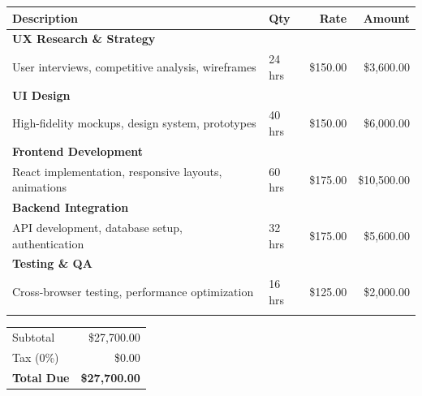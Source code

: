 \documentclass[11pt,a4paper]{article}
\begin{document}
\vspace{16pt}

\begin{tabularx}{\textwidth}{Xlrr}
    \toprule
    \textbf{Description} & \textbf{Qty} & \textbf{Rate} & \textbf{Amount} \\
    \midrule
    \addlinespace
    \textbf{UX Research \& Strategy} & & & \\
    \quad User interviews, competitive analysis, wireframes & 24 hrs & \$150.00 & \$3,600.00 \\
    \addlinespace
    \textbf{UI Design} & & & \\
    \quad High-fidelity mockups, design system, prototypes & 40 hrs & \$150.00 & \$6,000.00 \\
    \addlinespace
    \textbf{Frontend Development} & & & \\
    \quad React implementation, responsive layouts, animations & 60 hrs & \$175.00 & \$10,500.00 \\
    \addlinespace
    \textbf{Backend Integration} & & & \\
    \quad API development, database setup, authentication & 32 hrs & \$175.00 & \$5,600.00 \\
    \addlinespace
    \textbf{Testing \& QA} & & & \\
    \quad Cross-browser testing, performance optimization & 16 hrs & \$125.00 & \$2,000.00 \\
    \addlinespace
    \bottomrule
\end{tabularx}

\vspace{12pt}

\hfill
\begin{minipage}{0.4\textwidth}
    \begin{tabularx}{\textwidth}{Xr}
        Subtotal & \$27,700.00 \\
        \addlinespace
        Tax (0\%) & \$0.00 \\
        \midrule
        \addlinespace
        \textbf{\large Total Due} & \textbf{\large \$27,700.00} \\
    \end{tabularx}
\end{minipage}

\vspace{24pt}
\end{document}
